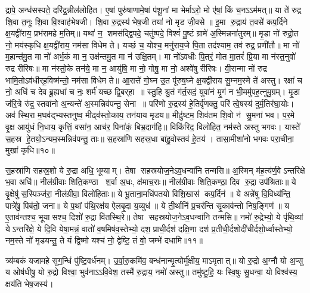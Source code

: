 द्रापे॒ अन्ध॑सस्पते॒ दरि॑द्र॒न्नील॑लोहित। ए॒षां पुरु॑षाणामे॒षां प॑शू॒नां मा भेर्माऽरो॒ मो ए॑षां॒ किं च॒नऽऽम॑मत्॥ या ते॑ रुद्र शि॒वा त॒नूः शि॒वा वि॒श्वाह॑भेषजी। शि॒वा रु॒द्रस्य॑ भेष॒जी तया॑ नो मृड जी॒वसे॥ इ॒मा रु॒द्राय॑ त॒वसे॑ कप॒र्दिने क्ष॒यद्वी॑राय॒ प्रभ॑रामहे म॒तिम्॥ यथा॑ न॒ शमस॑द्द्वि॒पदे॒ चतु॑ष्पदे॒ विश्वं॑ पु॒ष्टं ग्रामे॑ अ॒स्मिन्नना॑तुरम्॥ मृ॒डा नो॑ रुद्रो॒त नो॒ मय॑स्कृधि क्ष॒यद्वी॑राय॒ नम॑सा विधेम ते। यच्छं च॒ योश्च॒ मनु॑राय॒जे पि॒ता तद॑श्याम॒ तव॑ रुद्र॒ प्रणी॑तौ॥ मा नो॑ म॒हान्त॑मु॒त मा नो॑ अर्भ॒कं मा न॒ उक्ष॑न्तमु॒त मा न॑ उक्षि॒तम्। मा नो॑ऽवधीः पि॒तरं॒ मोत मा॒तरं॑ प्रि॒या मा न॑स्त॒नुवो॑ रुद्र रीरिषः॥ मा न॑स्तो॒के तन॑ये॒ मा न॒ आयु॑षि॒ मा नो॒ गोषु॒ मा नो॒ अश्वे॑षु रीरिषः। वी॒रान्मा नो॑ रुद्र भामि॒तोऽव॑धीर्‌ह॒विष्म॑न्तो॒ नम॑सा विधेम ते॥ आ॒रात्ते॑ गो॒घ्न उ॒त पू॑रुष॒घ्ने क्ष॒यद्वी॑राय सु॒म्नम॒स्मे ते॑ अस्तु। रक्षा॑ च नो॒ अधि॑ च देव ब्रू॒ह्यधा॑ च नः॒ शर्म॑ यच्छ द्वि॒बर्‌हा॥ स्तु॒हि श्रु॒तं ग॑र्त॒सदं॒ युवा॑नं मृ॒गं न भी॒ममु॑पह॒त्नुमु॒ग्रम्। मृ॒डा ज॑रि॒त्रे रु॑द्र॒ स्तवा॑नो अ॒न्यन्ते॑ अ॒स्मन्निव॑पन्तु॒ सेना॥ परि॑णो रु॒द्रस्य॑ हे॒तिर्वृ॑णक्तु॒ परि॑ त्वे॒षस्य॑ दुर्म॒तिर॑घा॒योः। अव॑ स्थि॒रा म॒घव॑द्भ्यस्तनुष्व॒ मीढ्व॑स्तो॒काय॒ तन॑याय मृडय॥ मीढु॑ष्टम॒ शिव॑तम शि॒वो न॑ सु॒मना॑ भव। प॒र॒मे वृ॒क्ष आयु॑धं नि॒धाय॒ कृत्तिं॒ वसा॑न॒ आच॑र॒ पिना॑कं॒ बिभ्र॒दाग॑हि॥ विकि॑रिद॒ विलो॑हित॒ नम॑स्ते अस्तु भगवः। यास्ते॑ स॒हस्र हे॒तयो॒ऽन्यम॒स्मन्निव॑पन्तु॒ ताः॥ स॒हस्रा॑णि सहस्र॒धा बा॑हु॒वोस्तव॑ हे॒तय॑। तासा॒मीशा॑नो भगवः परा॒चीना॒ मुखा॑ कृधि॥१०॥ 

स॒हस्रा॑णि सहस्र॒शो ये रु॒द्रा अधि॒ भूम्याम्। तेषा सहस्रयोज॒ने\-ऽव॒धन्वा॑नि तन्मसि॥ अ॒स्मिन् म॑ह॒त्य॑र्ण॒वेऽन्तरि॑क्षे भ॒वा अधि॑॥ नील॑ग्रीवाः शिति॒कण्ठा श॒र्वा अ॒धः, क्ष॑माच॒राः॥ नील॑ग्रीवाः शिति॒कण्ठा॒ दिव रु॒द्रा उप॑श्रिताः॥ ये वृ॒क्षेषु॑ स॒स्पिञ्ज॑रा॒ नील॑ग्रीवा॒ विलो॑हिताः॥ ये भू॒ताना॒मधि॑पतयो विशि॒खास॑ कप॒र्दिन॑॥ ये अन्ने॑षु वि॒विध्य॑न्ति॒ पात्रे॑षु॒ पिब॑तो॒ जना\sn ॥ ये प॒थां प॑थि॒रक्ष॑य ऐलबृ॒दा य॒व्युध॑॥ ये ती॒र्थानि॑ प्र॒चर॑न्ति सृ॒काव॑न्तो निष॒ङ्गिण॑॥ य ए॒ताव॑न्तश्च॒ भूयासश्च॒ दिशो॑ रु॒द्रा वि॑तस्थि॒रे॥ तेषा सहस्रयोज॒नेऽव॒धन्वा॑नि तन्मसि॥ नमो॑ रु॒द्रेभ्यो॒ ये पृ॑थि॒व्यां येऽन्तरि॑क्षे॒ ये दि॒वि येषा॒मन्नं॒ वातो॑ व॒\ar षमिष॑व॒स्तेभ्यो॒ दश॒ प्राची॒र्दश॑ दक्षि॒णा दश॑ प्र॒तीची॒र्दशो\-दी॑चीर्दशो॒र्ध्वास्तेभ्यो॒ नम॒स्ते नो॑ मृडयन्तु॒ ते यं द्वि॒ष्मो यश्च॑ नो॒ द्वेष्टि॒ तं वो॒ जम्भे॑ दधामि॥११॥ 

\lbrack त्र्य॑म्बकं यजामहे सुग॒न्धिं पु॑ष्टि॒वर्ध॑नम्। उ॒र्वा॒रु॒कमि॑व॒ बन्ध॑नान्मृ॒त्योर्मु॑क्षीय॒ माऽमृतात्॥ यो रु॒द्रो अ॒ग्नौ यो अ॒प्सु य ओष॑धीषु॒ यो रु॒द्रो विश्वा॒ भुव॑नाऽऽवि॒वेश॒ तस्मै॑ रु॒द्राय॒ नमो॑ अस्तु॥ तमु॑ष्टु॒हि॒ यः स्वि॒षुः सु॒धन्वा॒ यो विश्व॑स्य॒ क्षय॑ति भेष॒जस्य॑। 

